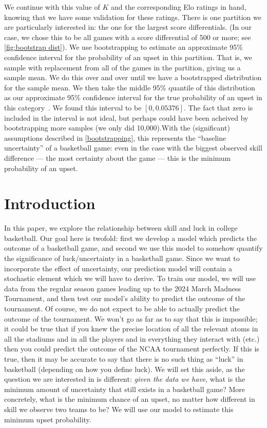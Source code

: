 \documentclass{article}
\begin{document}
We continue with this value of $K$ and the corresponding Elo ratings in hand, knowing that we have some validation for these ratings. There is one partition we are particularly interested in: the one for the largest score differentials. (In our case, we chose this to be all games with a score differential of 500 or more; see \autoref{fig:bootstrap dist}). We use bootstrapping to estimate an approximate 95\% confidence interval for the probability of an upset in this partition. That is, we sample with replacement from all of the games in the partition, giving us a sample mean. We do this over and over until we have a bootstrapped distribution for the sample mean. We then take the middle 95\% quantile of this distribution as our approximate 95\% confidence interval for the true probability of an upset in this category~\cite{uchicagoPercentileBootstrap}. We found this interval to be $[0, 0.05376]$. The fact that zero is included in the interval is not ideal, but perhaps could have been acheived by bootstrapping more samples (we only did 10,000).With the (significant) assumptions described in \autoref{bootstrapping}, this represents the ``baseline uncertainty'' of a basketball game: even in the case with the biggest observed skill difference --- the most certainty about the game --- this is the minimum probability of an upset. 
\newpage

\section{Introduction}
In this paper, we explore the relationship between skill and luck in college basketball. Our goal here is twofold: first we develop a model which predicts the outcome of a basketball game, and second we use this model to somehow quantify the significance of luck/uncertainty in a basketball game. Since we want to incorporate the effect of uncertainty, our prediction model will contain a stochastic element which we will have to derive. To train our model, we will use data from the regular season games leading up to the 2024 March Madness Tournament, and then test our model's ability to predict the outcome of the tournament. Of course, we do not expect to be able to actually predict the outcome of the tournament. We won't go as far as to say that this is impossible; it could be true that if you knew the precise location of all the relevant atoms in all the stadiums and in all the players and in everything they interact with (etc.) then you could predict the outcome of the NCAA tournament perfectly. If this is true, then it may be accurate to say that there is no such thing as ``luck'' in basketball (depending on how you define luck). We will set this aside, as the question we are interested in is different: \textit{given the data we have}, what is the minimum amount of uncertainty that still exists in a basketball game? More concretely, what is the minimum chance of an upset, no matter how different in skill we observe two teams to be? We will use our model to estimate this minimum upset probability.
\end{document}

